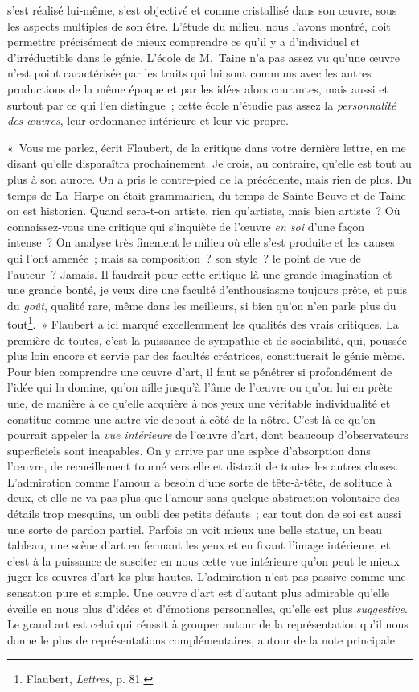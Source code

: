 \documentclass[french,twoside]{book} %
\begin{document}
s’est réalisé lui-même, s’est objectivé et comme cristallisé dans son œuvre, sous les aspects multiples de son être. L’étude du milieu, nous l’avons montré, doit permettre précisément de mieux comprendre ce qu’il y a d’individuel et d’irréductible dans le génie. L’école de M. Taine n’a pas assez vu qu’une œuvre n’est point caractérisée par les traits qui lui sont communs avec les autres productions de la même époque et par les idées alors courantes, mais aussi et surtout par ce qui l’en distingue ; cette école n’étudie pas assez la \emph{personnalité des œuvres}, leur ordonnance intérieure et leur vie propre.\par
« Vous me parlez, écrit Flaubert, de la critique dans votre dernière lettre, en me disant qu’elle disparaîtra prochainement. Je crois, au contraire, qu’elle est tout au plus à son aurore. On a pris le contre-pied de la précédente, mais rien de plus. Du temps de La Harpe on était grammairien, du temps de Sainte-Beuve et de Taine on est historien. Quand sera-t-on artiste, rien qu’artiste, mais bien artiste ? Où connaissez-vous une critique qui s’inquiète de l’œuvre \emph{en soi} d’une façon intense ? On analyse très finement le milieu où elle s’est produite et les causes qui l’ont amenée ; mais sa composition ? son style ? le point de vue de l’auteur ? Jamais. Il faudrait pour cette critique-là une grande imagination et une grande bonté, je veux dire une faculté d’enthousiasme toujours prête, et puis du \emph{goût}, qualité rare, même dans les meilleurs, si bien qu’on n’en parle plus du tout\footnote{ Flaubert, \emph{Lettres}, p. 81.}. » Flaubert a ici marqué excellemment les qualités des vrais critiques. La première de toutes, c’est la puissance de sympathie et de sociabilité, qui, poussée plus loin encore et servie par des facultés créatrices, constituerait le génie même. Pour bien comprendre une œuvre d’art, il faut se pénétrer si profondément de l’idée qui la domine, qu’on aille jusqu’à l’âme de l’œuvre ou qu’on lui en prête une, de manière à ce qu’elle acquière à nos yeux une véritable individualité et constitue comme une autre vie debout à côté de la nôtre. C’est là ce qu’on pourrait appeler la \emph{vue intérieure} de l’œuvre d’art, dont beaucoup d’observateurs superficiels sont incapables. On y arrive par une espèce d’absorption dans l’œuvre, de recueillement tourné vers elle et distrait de toutes les autres choses. L’admiration comme l’amour a besoin d’une sorte de tête-à-tête, de solitude à deux, et elle ne va pas plus que l’amour sans quelque abstraction volontaire des détails trop mesquins, un oubli des petits défauts ; car tout don de soi est aussi une sorte de pardon partiel. Parfois on voit mieux une belle statue, un beau tableau, une scène d’art en fermant les yeux et en fixant l’image intérieure, et c’est à la puissance de susciter en nous cette vue intérieure qu’on peut le mieux juger les œuvres d’art les plus hautes. L’admiration n’est pas passive comme une sensation pure et simple. Une œuvre d’art est d’autant plus admirable qu’elle éveille en nous plus d’idées et d’émotions personnelles, qu’elle est plus \emph{suggestive}. Le grand art est celui qui réussit à grouper autour de la représentation qu’il nous donne le plus de représentations complémentaires, autour de la note principale 
\end{document}
